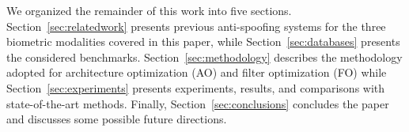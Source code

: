 


We organized the remainder of this work into five sections.
Section~\ref{sec:relatedwork} presents previous anti-spoofing systems for the three biometric modalities covered in this paper, while Section~\ref{sec:databases} presents the considered benchmarks. Section~\ref{sec:methodology} describes the methodology adopted for architecture optimization (AO) and filter optimization (FO) while Section~\ref{sec:experiments} presents experiments, results, and comparisons with state-of-the-art methods. Finally, Section~\ref{sec:conclusions} concludes the paper and discusses some possible future directions.
